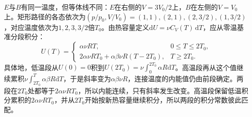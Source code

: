 \documentclass[UTF8,fontset=fandol,a4paper,11pt]{ctexart}
\begin{document}
$E$与$B$有同一温度，但等体线不同：$E$在右侧的$V=3V_0/2$上，$B$在左侧的$V=V_0$上。矩形路径的各态依次为$(p/p_0,V/V_0)=(1,1),(2,1),(2,3/2),(1,3/2)$，对应温度依次为$1,2,3,3/2$倍$T_0$。由热容量定义$\mathrm dU=\nu C_V(T)\,\mathrm dT$，应从零温基准分段积分：
\[
U(T)=
\begin{cases}
\alpha\nu RT,&0\le T\le2T_0,\\[2pt]
2\alpha\nu RT_0+\alpha\beta\nu R(T-2T_0),&T\ge2T_0.
\end{cases}
\]
具体地，低温段从$U(0)=0$积到$U(2T_0)=\nu\int_0^{2T_0}\alpha R\mathrm dT$。高温段再从这个值继续累积$\nu\int_{2T_0}^T\alpha\beta R\mathrm dT$，于是斜率变为$\alpha\beta\nu R$，连接温度的内能值仍由前段确定。两段在$2T_0$处都等于$2\alpha\nu RT_0$，所以内能连续，只有斜率发生改变。高温段保留低温积分累积的$2\alpha\nu RT_0$，并从$2T_0$开始按新热容量继续积分，所以两段的积分常数彼此匹配。
\end{document}
